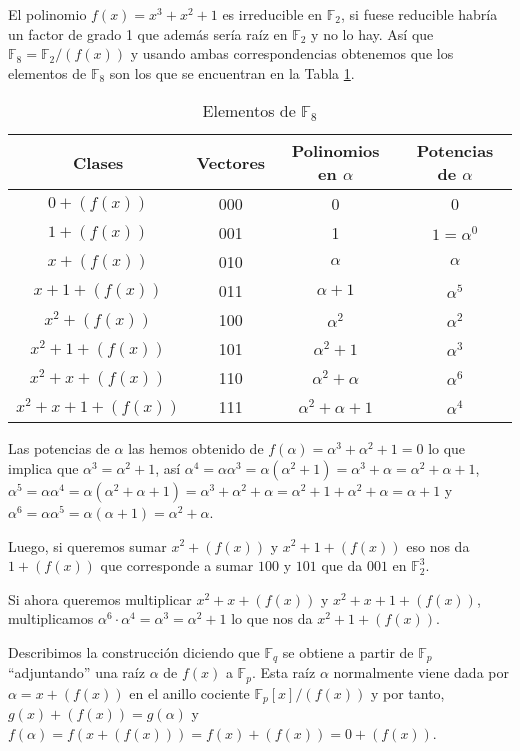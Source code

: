 \begin{exampleth}
El polinomio $f(x) = x^3+x^2+1$ es irreducible en $\mathbb{F}_2$, si fuese reducible habría un factor de grado 1 que además sería raíz en $\mathbb{F}_2$ y no lo hay. Así que $\mathbb{F}_8 = \mathbb{F}_2/(f(x))$ y usando ambas correspondencias obtenemos que los elementos de $\mathbb{F}_8$ son los que se encuentran en la Tabla \ref{ta:uno}.

\begin{table}
\begin{tabular}{ c | c | c | c}
	Clases & Vectores & Polinomios en $\alpha$ & Potencias de $\alpha$ \\ \hline
	$0+(f(x))$ & 000 & 0 & 0 \\
	$1+(f(x))$ & 001 & 1 & $1=\alpha^0$ \\ 
	$x+(f(x))$ & 010 & $\alpha$ & $\alpha$ \\
	$x+1 +(f(x))$ & 011 & $\alpha +1$ & $\alpha^5$ \\
	$x^2+(f(x))$ & 100 & $\alpha^2$ & $\alpha^2$ \\
	$x^2+1 +(f(x))$ & 101 & $\alpha^2+1$ & $\alpha^3$ \\
	$x^2+x +(f(x))$ & 110 & $\alpha^2+\alpha$ & $\alpha^6$ \\ 
	$x^2+x+1 +(f(x))$ & 111 & $\alpha^2+\alpha+1$ & $\alpha^4$

\end{tabular}
\caption{\label{ta:uno} Elementos de $\mathbb{F}_8$}
\end{table}
	
	Las potencias de $\alpha$ las hemos obtenido de $f(\alpha) = \alpha^3+\alpha^2+1 = 0$ lo que implica que $\alpha^3 = \alpha^2 + 1$, así $\alpha^4 = \alpha\alpha^3 = \alpha(\alpha^2 +1) = \alpha^3+\alpha = \alpha^2 +\alpha + 1$, $\alpha^5 = \alpha\alpha^4 = \alpha(\alpha^2 +\alpha + 1) = \alpha^3+\alpha^2 + \alpha = \alpha^2 + 1 + \alpha^2 +\alpha = \alpha + 1$ y $\alpha^6 = \alpha \alpha^5 = \alpha(\alpha + 1) = \alpha^2 + \alpha$.

Luego, si queremos sumar $x^2+(f(x))$ y $x^2+1+(f(x))$ eso nos da $1+(f(x))$ que corresponde a sumar $100$ y $101$ que da $001$ en $\mathbb{F}_2^3$.

Si ahora queremos multiplicar $x^2+x +(f(x))$ y $x^2+x+1+(f(x))$, multiplicamos $\alpha^6 \cdot \alpha^4  = \alpha^3 = \alpha^2 + 1$ lo que nos da $x^2+1 + (f(x))$.

\end{exampleth}

Describimos la construcción diciendo que $\mathbb{F}_q$ se obtiene a partir de $\mathbb{F}_p$ ``adjuntando'' una raíz $\alpha$ de $f(x)$ a $\mathbb{F}_p$. Esta raíz $\alpha$ normalmente viene dada por $\alpha = x + (f(x))$ en el anillo cociente $\mathbb{F}_p[x]/(f(x))$ y por tanto, $g(x) + (f(x)) = g(\alpha)$ y $f(\alpha) = f(x + (f(x))) = f(x) + (f(x)) = 0 + (f(x))$. 

